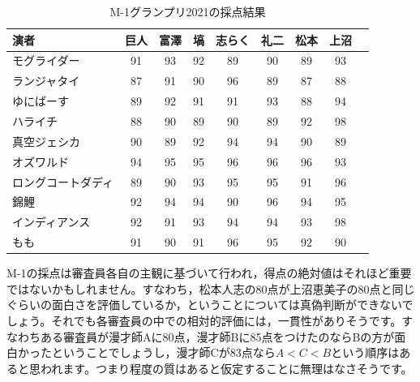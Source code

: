 \documentclass{ltjsbook}
\begin{document}
\begin{table}[ht]
    \centering
    \caption{M-1グランプリ2021の採点結果}
    \begin{tabular}{l|cccccccc}
        \hline
        演者        & 巨人 & 富澤 & 塙  & 志らく & 礼二 & 松本 & 上沼 \\
        \hline
        モグライダー    & 91 & 93 & 92 & 89  & 90 & 89 & 93 \\
        ランジャタイ    & 87 & 91 & 90 & 96  & 89 & 87 & 88 \\
        ゆにばーす     & 89 & 92 & 91 & 91  & 93 & 88 & 94 \\
        ハライチ      & 88 & 90 & 89 & 90  & 89 & 92 & 98 \\
        真空ジェシカ    & 90 & 89 & 92 & 94  & 94 & 90 & 89 \\
        オズワルド     & 94 & 95 & 95 & 96  & 96 & 96 & 93 \\
        ロングコートダディ & 89 & 90 & 93 & 95  & 95 & 91 & 96 \\
        錦鯉        & 92 & 94 & 94 & 90  & 96 & 94 & 95 \\
        インディアンス   & 92 & 91 & 93 & 94  & 94 & 93 & 98 \\
        もも        & 91 & 90 & 91 & 96  & 95 & 92 & 90 \\
        \hline
    \end{tabular}
    \label{tbl:h15_m1}
\end{table}


M-1の採点は審査員各自の主観に基づいて行われ，得点の絶対値はそれほど重要ではないかもしれません。すなわち，松本人志の80点が上沼恵美子の80点と同じぐらいの面白さを評価しているか，ということについては真偽判断ができないでしょう。それでも各審査員の中での相対的評価には，一貫性がありそうです。すなわちある審査員が漫才師Aに80点，漫才師Bに85点をつけたのならBの方が面白かったということでしょうし，漫才師Cが83点なら$A<C<B$という順序はあると思われます。つまり程度の質はあると仮定することに無理はなさそうです。
\end{document}

